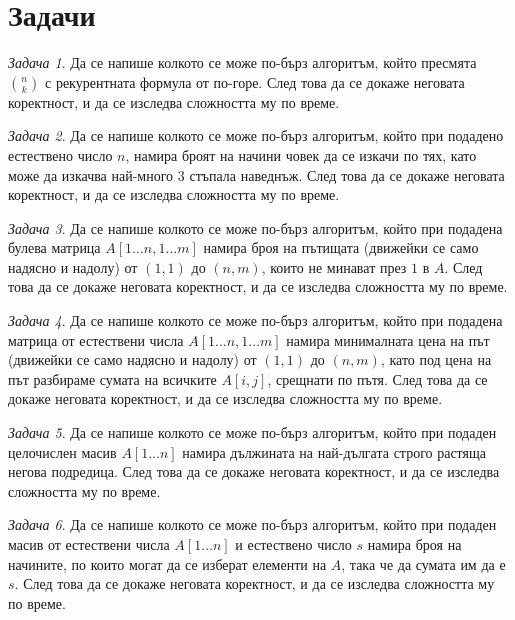 \documentclass{article}
\theoremstyle{definition}
\theoremstyle{plain}
\theoremstyle{remark}
\newtheorem{problem}{Задача}
\theoremstyle{definition}
\begin{document}
\section*{Задачи}

\begin{problem}
Да се напише колкото се може по-бърз алгоритъм, който пресмята ${n \choose k}$ с рекурентната формула от по-горе.
След това да се докаже неговата коректност, и да се изследва сложността му по време.
\end{problem}

\begin{problem}
Да се напише колкото се може по-бърз алгоритъм, който при подадено естествено число $n$, намира броят на начини човек да се изкачи по тях, като може да изкачва най-много $3$ стъпала наведнъж.
След това да се докаже неговата коректност, и да се изследва сложността му по време.
\end{problem}

\begin{problem}
Да се напише колкото се може по-бърз алгоритъм, който при подадена булева матрица $A[1 \dots n, 1 \dots m]$ намира броя на пътищата (движейки се само надясно и надолу) от $(1, 1)$ до $(n, m)$, които не минават през $1$ в $A$.
След това да се докаже неговата коректност, и да се изследва сложността му по време.
\end{problem}

\begin{problem}
Да се напише колкото се може по-бърз алгоритъм, който при подадена матрица от естествени числа $A[1 \dots n, 1 \dots m]$ намира минималната цена на път (движейки се само надясно и надолу) от $(1, 1)$ до $(n, m)$, като под цена на път разбираме сумата на всичките $A[i, j]$, срещнати по пътя.
След това да се докаже неговата коректност, и да се изследва сложността му по време.
\end{problem}


\begin{problem}
Да се напише колкото се може по-бърз алгоритъм, който при подаден целочислен масив $A[1 \dots n]$ намира дължината на най-дългата строго растяща негова подредица.
След това да се докаже неговата коректност, и да се изследва сложността му по време.
\end{problem}

\begin{problem}
Да се напише колкото се може по-бърз алгоритъм, който при подаден масив от естествени числа $A[1 \dots n]$ и естествено число $s$ намира броя на начините, по които могат да се изберат елементи на $A$, така че да сумата им да е $s$.
След това да се докаже неговата коректност, и да се изследва сложността му по време.
\end{problem}
\end{document}
